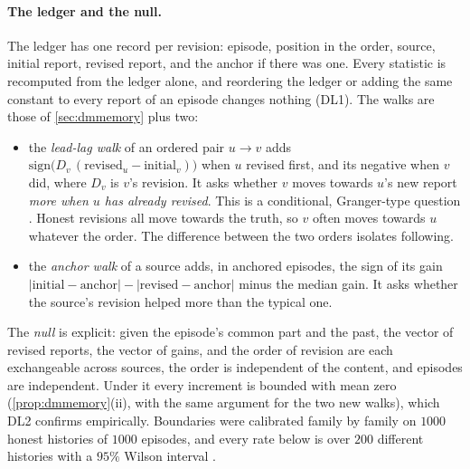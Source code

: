 \documentclass[11pt]{article}
\theoremstyle{definition}\newtheorem{definition}[theorem]{Definition}\newtheorem{remark}[theorem]{Remark}\newtheorem{example}[theorem]{Example}\newtheorem{problem}[theorem]{Open problem}\crefname{problem}{Problem}{Problems}
\begin{document}
\paragraph{The ledger and the null.} The ledger has one record per revision: episode, position in the order, source, initial report, revised report, and the anchor if there was one. Every statistic is recomputed from the ledger alone, and reordering the ledger or adding the same constant to every report of an episode changes nothing (DL1). The walks are those of \cref{sec:dmmemory} plus two:
\begin{itemize}
\item the \emph{lead-lag walk} of an ordered pair $u\to v$ adds $\mathrm{sign}\big(D_v\,(\text{revised}_u-\text{initial}_v)\big)$ when $u$ revised first, and its negative when $v$ did, where $D_v$ is $v$'s revision. It asks whether $v$ moves towards $u$'s new report \emph{more when $u$ has already revised}. This is a conditional, Granger-type question \cite{Granger1969}. Honest revisions all move towards the truth, so $v$ often moves towards $u$ whatever the order. The difference between the two orders isolates following.
\item the \emph{anchor walk} of a source adds, in anchored episodes, the sign of its gain $|\text{initial}-\text{anchor}|-|\text{revised}-\text{anchor}|$ minus the median gain. It asks whether the source's revision helped more than the typical one.
\end{itemize}
The \emph{null} is explicit: given the episode's common part and the past, the vector of revised reports, the vector of gains, and the order of revision are each exchangeable across sources, the order is independent of the content, and episodes are independent. Under it every increment is bounded with mean zero (\cref{prop:dmmemory}(ii), with the same argument for the two new walks), which DL2 confirms empirically. Boundaries were calibrated family by family on $1000$ honest histories of $1000$ episodes, and every rate below is over $200$ different histories with a $95\%$ Wilson interval \cite{Wilson1927}.
\end{document}
